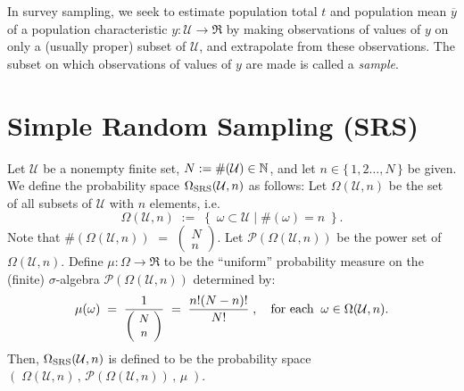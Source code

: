 \documentclass{article}
\begin{document}
In survey sampling, we seek to estimate population total $t$ and population mean $\overline{y}$ of a population characteristic $y : \mathcal{U} \longrightarrow \Re$ by making observations of values of $y$ on only a (usually proper) subset of $\mathcal{U}$, and extrapolate from these observations.  The subset on which observations of values of $y$ are made is called a \emph{sample}.


\section{Simple Random Sampling (SRS)}
\setcounter{theorem}{0}

\begin{definition}\quad
Let $\mathcal{U}$ be a nonempty finite set, $N:=\#(\mathcal{U})\in\mathbb{N}$, and let $n \in \{\,1,2\ldots,N\,\}$ be given.  We define the probability space $\Omega_{\textnormal{SRS}}(\mathcal{U},n)$ as follows:  Let $\Omega(\mathcal{U},n)$ be the set of all subsets of $\mathcal{U}$ with $n$ elements, i.e.
\begin{equation*}
     \Omega(\mathcal{U},n)\; := \; \left\{ \; \omega\subset\mathcal{U} \;\vert\; \#(\omega)=n \; \right\}.
\end{equation*}
Note that $\#\!\left(\Omega(\mathcal{U},n)\right)$ $=$ {\small$\left(\!\begin{array}{c} N \\ n \end{array}\!\right)$}.
Let $\mathcal{P}(\Omega(\mathcal{U},n))$ be the power set of $\Omega(\mathcal{U},n)$.
Define $\mu : \Omega \longrightarrow \Re$ to be the ``uniform'' probability measure on the (finite) $\sigma$-algebra $\mathcal{P}(\Omega(\mathcal{U},n))$ determined by:
\begin{equation*}
   \mu(\omega) \; = \; \dfrac{1}{\textnormal{\small$\left(\!\begin{array}{c} N \\ n \end{array}\!\right)$}} \; = \; \dfrac{n!(N-n)!}{N!}\;,
   \quad\textnormal{for each}\;\; \omega \in \Omega(\mathcal{U},n).
\end{equation*}
Then, $\Omega_{\textnormal{SRS}}(\mathcal{U},n)$ is defined to be the probability space $\left(\;\Omega(\mathcal{U},n)\,,\,\mathcal{P}(\Omega(\mathcal{U},n))\,,\,\mu\;\right)$.
\end{definition}
\end{document}
